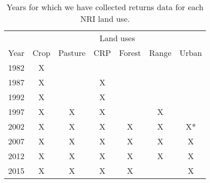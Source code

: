 \documentclass[11pt]{article}
\begin{document}
\begin{table} \centering
\begin{threeparttable}[h!]
\caption{Years for which we have collected returns data for each NRI land use.} 
\begin{tabular}{lcccccc}
\toprule 
 & \multicolumn{6}{c}{Land uses} \\ \cline{2-7}
Year & Crop & Pasture & CRP & Forest & Range & Urban \\ \midrule
1982 & X & & & & & \\
1987 & X & & X & & &  \\
1992 & X & & X & & & \\
1997 & X & X & X & & X & \\ 
2002 & X & X &  X & X& X & X* \\ 
2007 & X & X & X & X & X & X \\
2012 & X & X & X & X & X & X\\
2015 & X & X & X & X &  & X \\ \bottomrule
\end{tabular}
\end{threeparttable}
\end{table}



\end{document}
